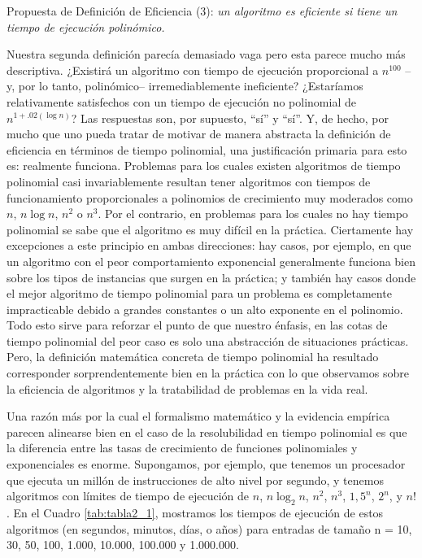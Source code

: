 \documentclass[a4paper, 12pt]{book}
\theoremstyle{dotless}
\begin{document}
\vspace{18pt}\noindent
\colorbox{mygray}{\parbox{0.99\textwidth}{
Propuesta de Definición de Eficiencia (3): \textit{un algoritmo es eficiente si tiene un tiempo de ejecución polinómico.}}}
\vspace{18pt}

Nuestra segunda definición parecía demasiado vaga pero esta parece mucho más descriptiva. ¿Existirá un algoritmo con tiempo de ejecución proporcional a $n^{100}$ --y, por lo tanto, polinómico-- irremediablemente ineficiente? ¿Estaríamos relativamente satisfechos con un tiempo de ejecución no polinomial de $n^{1+.02(\log n)}$? Las respuestas son, por supuesto, ``sí'' y ``sí''. Y, de hecho, por mucho que uno pueda tratar de motivar de manera abstracta la definición de eficiencia en términos de tiempo polinomial, una justificación primaria para esto es: realmente funciona. Problemas para los cuales existen algoritmos de tiempo polinomial casi invariablemente resultan tener algoritmos con tiempos de funcionamiento proporcionales a polinomios de crecimiento muy moderados como $n$, $n \log n$, $n^2$ o $n^3$. Por el contrario, en problemas para los cuales no hay tiempo polinomial se sabe que el algoritmo es muy difícil en la práctica. Ciertamente hay excepciones a este principio en ambas direcciones: hay casos, por ejemplo, en que un algoritmo con el peor comportamiento exponencial generalmente funciona bien sobre los tipos de instancias que surgen en la práctica; y también hay casos donde el mejor algoritmo de tiempo polinomial para un problema es completamente impracticable debido a grandes constantes o un alto exponente en el polinomio. Todo esto sirve para reforzar el punto de que nuestro énfasis, en las cotas de tiempo polinomial del peor caso es solo una abstracción de situaciones prácticas. Pero, la definición matemática concreta de tiempo polinomial ha resultado corresponder sorprendentemente bien en la práctica con lo que observamos sobre la eficiencia de algoritmos y la tratabilidad de problemas en la vida real.

Una razón más por la cual el formalismo matemático y la evidencia empírica parecen alinearse bien en el caso de la resolubilidad en tiempo polinomial es que la diferencia entre las tasas de crecimiento de funciones polinomiales y exponenciales es enorme.
Supongamos, por ejemplo, que tenemos un procesador que ejecuta un millón de instrucciones de alto nivel por segundo, y tenemos algoritmos con límites de tiempo de ejecución de $n$, $n \log_2 n$, $n^2$, $n^3$, $1,5^n$, $2^n$, y $n!$. En el Cuadro \ref{tab:tabla2_1}, mostramos los tiempos de ejecución de estos algoritmos (en segundos, minutos, días, o años) para entradas de tamaño n = 10, 30, 50, 100, 1.000, 10.000, 100.000 y 1.000.000. 
\end{document}
